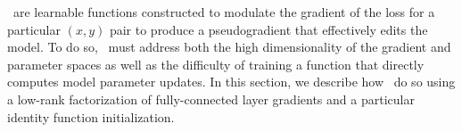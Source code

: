\documentclass{article}
\begin{document}
\name~are learnable functions
constructed to modulate the gradient of the loss for a particular $(x,y)$ pair to produce a pseudogradient that effectively edits the model. To do so, \name~must address both the high dimensionality of the gradient and parameter spaces as well as the difficulty of training a function that directly computes model parameter updates. In this section, we describe how \name~do so using a low-rank factorization of fully-connected layer gradients and a particular identity function initialization.


\end{document}
